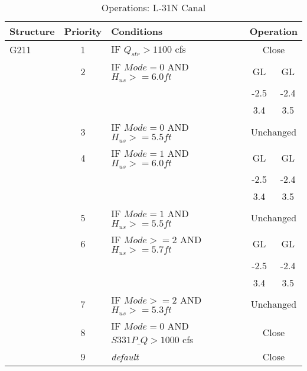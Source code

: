 \scriptsize
\begin{table}[!h]
\centering
\caption{Operations: L-31N Canal}
\label{tab:M11opsL31Na}
\begin{tabular}{|l|c|l|c|c|}
\hline
\textbf{Structure} & \textbf{Priority}  & \textbf{Conditions} & \multicolumn{2}{|c|}{\textbf{Operation}}   \\
\hline
\hline
G211          &  1  & IF $Q_{str}>1100$ cfs         & \multicolumn{2}{|c|}{Close}   \\
\hline
              &  2  & IF $Mode=0$  AND $H_{us}>=6.0ft$                     & GL    & GL   \\
              &     &        & -2.5  & -2.4 \\
              &     &                               & 3.4   & 3.5  \\
\hline
              &  3  & IF $Mode=0$ AND $H_{us}>=5.5ft$                   & \multicolumn{2}{|c|}{Unchanged}   \\
\hline
              &  4  & IF $Mode=1$ AND $H_{us}>=6.0ft$                   & GL    & GL   \\
              &     &           & -2.5  & -2.4 \\
              &     &                               & 3.4   & 3.5  \\
\hline
              &  5  & IF $Mode=1$ AND $H_{us}>=5.5ft$                   & \multicolumn{2}{|c|}{Unchanged}   \\
\hline
              &  6  & IF $Mode>=2$ AND $H_{us}>=5.7ft$                  & GL    & GL   \\
              &     &           & -2.5  & -2.4 \\
              &     &                               & 3.4   & 3.5  \\
\hline
              &  7  & IF $Mode>=2$ AND $H_{us}>=5.3ft$                  & \multicolumn{2}{|c|}{Unchanged}   \\
\hline
              &  8  & \textcolor[rgb]{1.00,0.00,0.00}{IF $Mode=0$ AND $S331P\_Q>1000$ cfs}   & \multicolumn{2}{|c|}{\textcolor[rgb]{1.00,0.00,0.00}{Close}}           \\
\hline
              &  9  & \it{default}                  & \multicolumn{2}{|c|}{Close}           \\
\hline
\hline
\end{tabular}
\end{table}
\normalsize

